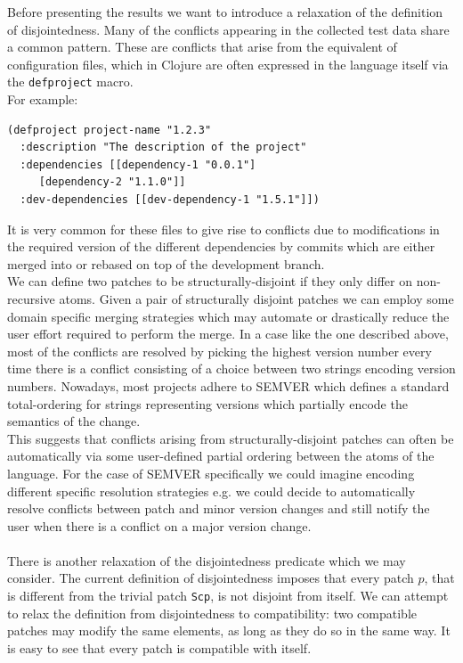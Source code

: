 \documentclass[11pt, titlepage]{article}
\newcommand{\toHaskell}[1]{\texttt{#1}\xspace}
\newcommand{\toClojure}[1]{\texttt{#1}\xspace}
\newcommand{\scp}{\toHaskell{Scp}}
\begin{document}
Before presenting the results we want to introduce a relaxation of the definition of disjointedness. Many of the conflicts appearing in the collected test data share a common pattern. These are conflicts that arise from the equivalent of configuration files, which in Clojure are often expressed in the language itself via the \toClojure{defproject} macro.
\\
For example:

\begin{verbatim}
(defproject project-name "1.2.3"
  :description "The description of the project"
  :dependencies [[dependency-1 "0.0.1"]
     [dependency-2 "1.1.0"]]
  :dev-dependencies [[dev-dependency-1 "1.5.1"]])
\end{verbatim}

It is very common for these files to give rise to conflicts due to modifications in the required version of the different dependencies by commits which are either merged into or rebased on top of the development branch. 
\\
We can define two patches to be structurally-disjoint if they only differ on non-recursive atoms. Given a pair of structurally disjoint patches we can employ some domain specific merging strategies which may automate or drastically reduce the user effort required to perform the merge. In a case like the one described above, most of the conflicts are resolved by picking the highest version number every time there is a conflict consisting of a choice between two strings encoding version numbers. Nowadays, most projects adhere to SEMVER \cite{semver} which defines a standard total-ordering for strings representing versions which partially encode the semantics of the change. 
\\
This suggests that conflicts arising from structurally-disjoint patches can often be automatically via some user-defined partial ordering between the atoms of the language. For the case of SEMVER specifically we could imagine encoding different specific resolution strategies e.g. we could decide to automatically resolve conflicts between patch and minor version changes and still notify the user when there is a conflict on a major version change.
\\
\\
There is another relaxation of the disjointedness predicate which we may consider. The current definition of disjointedness imposes that every patch $p$, that is different from the trivial patch \scp, is not disjoint from itself. We can attempt to relax the definition from disjointedness to compatibility: two compatible patches may modify the same elements, as long as they do so in the same way. It is easy to see that every patch is compatible with itself.
\end{document}
